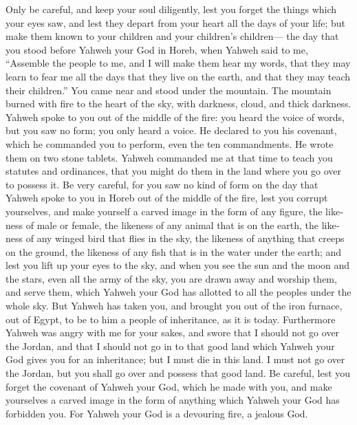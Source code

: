 \begin{paracol}{2}
\begin{otherlanguage}{english}
 Only be careful, and keep your soul diligently, lest you
forget the things which your eyes saw, and lest they depart from your
heart all the days of your life; but make them known to your children
and your children's children---  the day that you stood
before Yahweh your God in Horeb, when Yahweh said to me, ``Assemble the
people to me, and I will make them hear my words, that they may learn to
fear me all the days that they live on the earth, and that they may
teach their children.''  You came near and stood under
the mountain. The mountain burned with fire to the heart of the sky,
with darkness, cloud, and thick darkness.  Yahweh spoke
to you out of the middle of the fire: you heard the voice of words, but
you saw no form; you only heard a voice.  He declared to
you his covenant, which he commanded you to perform, even the ten
commandments. He wrote them on two stone tablets.  Yahweh
commanded me at that time to teach you statutes and ordinances, that you
might do them in the land where you go over to possess it.
 Be very careful, for you saw no kind of form on the day
that Yahweh spoke to you in Horeb out of the middle of the fire,
 lest you corrupt yourselves, and make yourself a carved
image in the form of any figure, the likeness of male or female,
 the likeness of any animal that is on the earth, the
likeness of any winged bird that flies in the sky,  the
likeness of anything that creeps on the ground, the likeness of any fish
that is in the water under the earth;  and lest you lift
up your eyes to the sky, and when you see the sun and the moon and the
stars, even all the army of the sky, you are drawn away and worship
them, and serve them, which Yahweh your God has allotted to all the
peoples under the whole sky.  But Yahweh has taken you,
and brought you out of the iron furnace, out of Egypt, to be to him a
people of inheritance, as it is today.  Furthermore
Yahweh was angry with me for your sakes, and swore that I should not go
over the Jordan, and that I should not go in to that good land which
Yahweh your God gives you for an inheritance;  but I must
die in this land. I must not go over the Jordan, but you shall go over
and possess that good land.  Be careful, lest you forget
the covenant of Yahweh your God, which he made with you, and make
yourselves a carved image in the form of anything which Yahweh your God
has forbidden you.  For Yahweh your God is a devouring
fire, a jealous God.


\end{otherlanguage}
\end{paracol}
